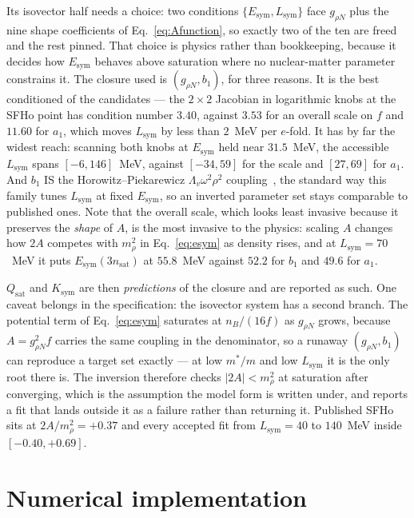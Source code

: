 \documentclass[aps,prc,onecolumn,superscriptaddress,nofootinbib,10pt]{revtex4-2}
\newcommand{\nB}{n_B}
\newcommand{\nsat}{n_{\mathrm{sat}}}
\begin{document}
Its isovector half needs a choice: two conditions $\{E_{\mathrm{sym}},
L_{\mathrm{sym}}\}$ face $g_{\rho N}$ plus the nine shape coefficients of
Eq.~\eqref{eq:Afunction}, so exactly two of the ten are freed and the rest
pinned. That choice is physics rather than bookkeeping, because it decides how
$E_{\mathrm{sym}}$ behaves above saturation where no nuclear-matter parameter
constrains it. The closure used is $(g_{\rho N}, b_1)$, for three reasons. It
is the best conditioned of the candidates --- the $2\times2$ Jacobian in
logarithmic knobs at the SFHo point has condition number $3.40$, against
$3.53$ for an overall scale on $f$ and $11.60$ for $a_1$, which moves
$L_{\mathrm{sym}}$ by less than $2$~MeV per $e$-fold. It has by far the widest
reach: scanning both knobs at $E_{\mathrm{sym}}$ held near $31.5$~MeV, the
accessible $L_{\mathrm{sym}}$ spans $[-6, 146]$~MeV, against $[-34, 59]$ for
the scale and $[27, 69]$ for $a_1$. And $b_1$ IS the Horowitz--Piekarewicz
$\Lambda_v \omega^2\rho^2$ coupling~\cite{HorowitzPiekarewicz2001}, the
standard way this family tunes $L_{\mathrm{sym}}$ at fixed
$E_{\mathrm{sym}}$, so an inverted parameter set stays comparable to published
ones. Note that the overall scale, which looks least invasive because it
preserves the \emph{shape} of $A$, is the most invasive to the physics:
scaling $A$ changes how $2A$ competes with $m_\rho^2$ in
Eq.~\eqref{eq:esym} as density rises, and at $L_{\mathrm{sym}} = 70$~MeV it
puts $E_{\mathrm{sym}}(3\nsat)$ at $55.8$~MeV against $52.2$ for $b_1$ and
$49.6$ for $a_1$.

$Q_{\mathrm{sat}}$ and $K_{\mathrm{sym}}$ are then \emph{predictions} of the
closure and are reported as such. One caveat belongs in the specification: the
isovector system has a second branch. The potential term of
Eq.~\eqref{eq:esym} saturates at $\nB/(16 f)$ as $g_{\rho N}$ grows, because
$A = g_{\rho N}^2 f$ carries the same coupling in the denominator, so a
runaway $(g_{\rho N}, b_1)$ can reproduce a target set exactly --- at low
$m^*/m$ and low $L_{\mathrm{sym}}$ it is the only root there is. The inversion
therefore checks $|2A| < m_\rho^2$ at saturation after converging, which is
the assumption the model form is written under, and reports a fit that lands
outside it as a failure rather than returning it. Published SFHo sits at
$2A/m_\rho^2 = +0.37$ and every accepted fit from $L_{\mathrm{sym}} = 40$ to
$140$~MeV inside $[-0.40, +0.69]$.

\section{Numerical implementation}
\end{document}
